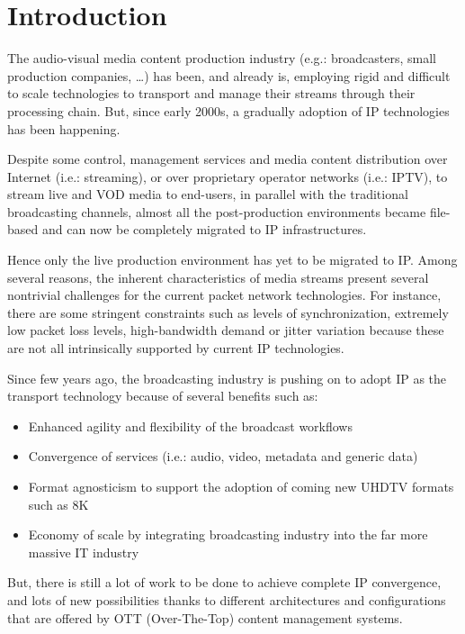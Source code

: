 \cleardoublepage
{}
\chapter*{Introduction}

The audio-visual media content production industry (e.g.: broadcasters, small production companies, \ldots) has been, and already is, employing rigid and difficult to scale technologies to transport and manage their streams through their processing chain. But, since early 2000s, a gradually adoption of IP technologies has been happening.

Despite some control, management services and media content distribution over Internet (i.e.: streaming), or over proprietary operator networks (i.e.: IPTV), to stream live and VOD media to end-users, in parallel with the traditional broadcasting channels, almost all the post-production environments became file-based and can now be completely migrated to IP infrastructures. 

Hence only the live production environment has yet to be migrated to IP. Among several reasons, the inherent characteristics of media streams present several nontrivial challenges for the current packet network technologies. For instance, there are some stringent constraints such as levels of synchronization, extremely low packet loss levels, high-bandwidth demand or jitter variation because these are not all intrinsically supported by current IP technologies.

Since few years ago, the broadcasting industry is pushing on to adopt IP as the transport technology because of several benefits such as:

\begin{itemize}
  \item Enhanced agility and flexibility of the broadcast workflows
  \item Convergence of services (i.e.: audio, video, metadata and generic data)
  \item Format agnosticism to support the adoption of coming new UHDTV formats such as 8K 
  \item Economy of scale by integrating broadcasting industry into the far more massive IT industry
\end{itemize}

But, there is still a lot of work to be done to achieve complete IP convergence, and lots of new possibilities thanks to different architectures and configurations that are offered by OTT (Over-The-Top) content management systems. 

